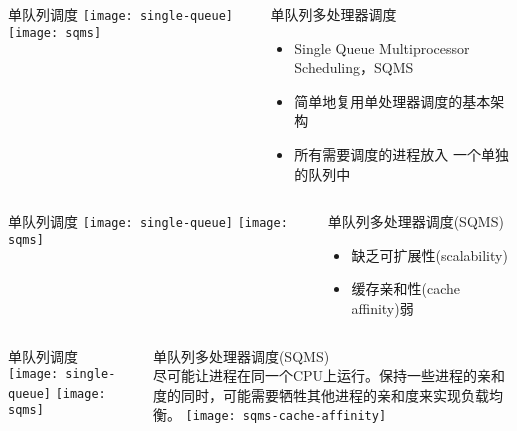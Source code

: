\begin{frame}
	\begin{columns}
	\begin{column}{.5\textwidth}
	\Large \centering
	单队列调度
    \texttt{[image: single-queue]}
	\texttt{[image: sqms]}	
	\end{column}
	
	\begin{column}{.5\textwidth}
		\large 单队列多处理器调度
    \begin{itemize}
        \item Single Queue Multiprocessor Scheduling，SQMS
        \item 简单地复用单处理器调度的基本架构
        \item 所有需要调度的进程放入 一个单独的队列中
    \end{itemize}

	\end{column}
\end{columns}
\end{frame}
\begin{frame}
	\begin{columns}
		\begin{column}{.5\textwidth}
			\Large \centering
			单队列调度
			\texttt{[image: single-queue]}
			\texttt{[image: sqms]}	
		\end{column}
		
		\begin{column}{.5\textwidth}
			\large
			单队列多处理器调度(SQMS)
			

			\begin{itemize}\large
				\item 缺乏可扩展性(scalability)
				\item 缓存亲和性(cache affinity)弱
			\end{itemize}
			
		\end{column}
	\end{columns}
\end{frame}


\begin{frame}
	\begin{columns}
		\begin{column}{.5\textwidth}
			\Large \centering
			单队列调度
			\texttt{[image: single-queue]}
			\texttt{[image: sqms]}	
		\end{column}
		
		\begin{column}{.5\textwidth}
			\large
			单队列多处理器调度(SQMS) \\
			\normalsize
			尽可能让进程在同一个CPU上运行。保持一些进程的亲和度的同时，可能需要牺牲其他进程的亲和度来实现负载均衡。
			\texttt{[image: sqms-cache-affinity]}

			
		\end{column}
	\end{columns}
\end{frame}

